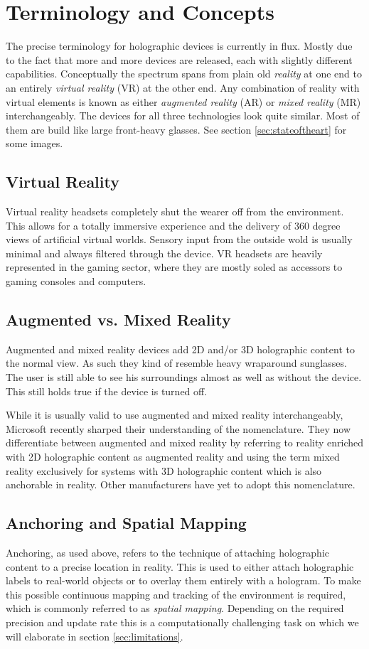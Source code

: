 \documentclass[11pt, a4paper]{IEEEtran}
\begin{document}
\section{Terminology and Concepts}\label{sec:concepts}
The precise terminology for holographic devices is currently in flux. Mostly due to the fact that more and more devices are released, each with slightly different capabilities. Conceptually the spectrum spans from plain old \emph{reality} at one end to an entirely \emph{virtual reality} (VR) at the other end. Any combination of reality with virtual elements is known as either \emph{augmented reality} (AR) or \emph{mixed reality} (MR) interchangeably. The devices for all three technologies look quite similar. Most of them are build like large front-heavy glasses. See section \ref{sec:stateoftheart} for some images.

\subsection{Virtual Reality}
Virtual reality headsets completely shut the wearer off from the environment. This allows for a totally immersive experience and the delivery of 360 degree views of artificial virtual worlds. Sensory input from the outside wold is usually minimal and always filtered through the device. VR headsets are heavily represented in the gaming sector, where they are mostly soled as accessors to gaming consoles and computers. 

\subsection{Augmented vs. Mixed  Reality}
Augmented and mixed reality devices add 2D and/or 3D holographic content to the normal view. As such they kind of resemble heavy wraparound sunglasses. The user is still able to see his surroundings almost as well as without the device. This still holds true if the device is turned off.

While it is usually valid to use augmented and mixed reality interchangeably, Microsoft recently  sharped their understanding of the nomenclature. They now differentiate between augmented and mixed reality by referring to reality enriched with 2D holographic content as augmented reality and using the term mixed reality exclusively for systems with 3D holographic content which is also anchorable in reality. Other manufacturers have yet to adopt this nomenclature.

\subsection{Anchoring and Spatial Mapping}
Anchoring, as used above, refers to the technique of attaching holographic content to a precise location in reality. This is used to either attach holographic labels to real-world objects or to overlay them entirely with a hologram. To make this possible continuous mapping and tracking of the environment is required, which is commonly referred to as \emph{spatial mapping}. Depending on the required precision and update rate this is a computationally challenging task on which we will elaborate in section \ref{sec:limitations}.
\end{document}
